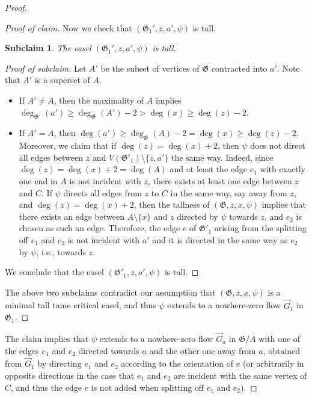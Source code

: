 \documentclass{article}
\newcommand\g{\mathfrak{G}}
\newtheorem*{subclaim*}{Subclaim}
\newenvironment{subproof}{%
  \renewcommand{\qedsymbol}{$\blacksquare$}%
  \begin{proof}[Proof of claim]%
}{%
  \end{proof}%
}
\newenvironment{subsubproof}{%
  \renewcommand{\qedsymbol}{$\blacksquare$}%
  \begin{proof}[Proof of subclaim]%
}{%
  \end{proof}%
}
\begin{document}
\begin{proof}
\begin{subproof}
Now we check that $(\g_{1}',z,a',\psi)$ is tall.

\begin{subclaim*}
The easel $(\g_{1}',z,a',\psi)$ is tall.
\end{subclaim*}

\begin{subsubproof}
Let $A'$ be the subset of vertices of $\g$ contracted into $a'$. Note that $A'$ is a superset of $A$.
\begin{itemize}
\item If $A'\neq A$, then the maximality of $A$ implies $\deg_{\g'}(a')\ge \deg_{\g}(A')-2>\deg(x)\ge \deg(z)-2$.
\item If $A'=A$, then $\deg(a')\ge \deg_{\g}(A)-2=\deg(x)\ge \deg(z)-2$.  Moreover, we claim that if $\deg(z)=\deg(x)+2$, then $\psi$ does not direct all edges between $z$ and $V(\g'_1)\setminus \{z,a'\}$ the same way.  Indeed, since $\deg(z)=\deg(x)+2=\deg(A)$ and at least the edge $e_1$ with exactly one end in $A$ is not incident with $z$, there exists at least one edge between $z$
and $C$.  If $\psi$ directs all edges from $z$ to $C$ in the same way, say away from $z$, and $\deg(z)=\deg(x)+2$, then the tallness of $(\g,z,x,\psi)$ implies that there exists an edge between $A\setminus\{x\}$ and $z$ directed by $\psi$ towards $z$, and $e_2$ is chosen as such an edge.
Therefore, the edge $e$ of $\g'_1$ arising from the splitting off $e_1$ and $e_2$ is not incident with $a'$ and it is directed in the same way as $e_2$ by $\psi$, i.e., towards $z$.
\end{itemize}
We conclude that the easel $(\g'_1,z,a',\psi)$ is tall. 
\end{subsubproof}


  The above two subclaims contradict our assumption that $(\g,z,x,\psi)$ is a minimal tall tame critical easel, and thus $\psi$ extends to a nowhere-zero flow $\vec{G}_1$ in $\g_1$.
\end{subproof}

The claim implies that $\psi$ extends to a nowhere-zero flow $\vec{G}_a$ in $\g/A$ with one of the edges $e_1$ and $e_2$ directed towards $a$ and the other one away from $a$,
obtained from $\vec{G}_1$ by directing $e_1$ and $e_2$ according to the orientation of $e$ (or arbitrarily in opposite directions in the
case that $e_1$ and $e_2$ are incident with the same vertex of $C$, and thus the edge $e$ is not added when splitting off $e_1$ and $e_2$).


\end{proof}
\end{document}
